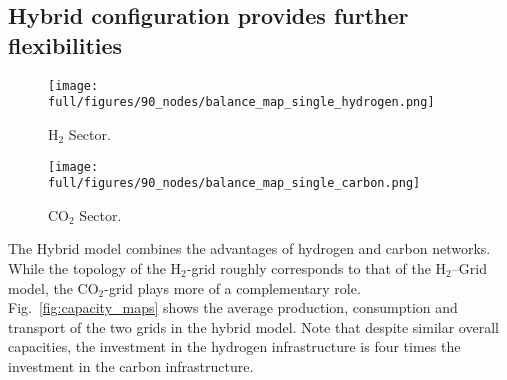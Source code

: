 \documentclass[twocolumn]{article}
\newcommand{\carbon}{CO$_2$}
\newcommand{\hydrogen}{H$_2$}
\newcommand{\hydrogengrid}{\hydrogen{}--Grid}
\begin{document}
\subsection*{Hybrid configuration provides further flexibilities}

\begin{figure*}[ht!]
    \centering
    \begin{subfigure}{.49\textwidth}
        \centering
        \texttt{[image: full/figures/90\_nodes/balance\_map\_single\_hydrogen.png]}
        \caption{\hydrogen{} Sector.}
        \label{fig:capacity_map_hydrogen_co2}
    \end{subfigure}
    \hfill
    \begin{subfigure}{.49\textwidth}
        \centering
        \texttt{[image: full/figures/90\_nodes/balance\_map\_single\_carbon.png]}
        \caption{\carbon{} Sector.}
        \label{fig:capacity_map_carbon_co2}
    \end{subfigure}%
    \caption{Optimal production and transport capacities of the carbon and hydrogen sector in a net-zero energy system in Europe with both \carbon{} and \hydrogen{} network expansion (Hybrid).
    }
    \label{fig:capacity_maps}
\end{figure*}

The Hybrid model combines the advantages of hydrogen and carbon networks. While the topology of the \hydrogen{}-grid roughly corresponds to that of the \hydrogengrid{} model, the \carbon{}-grid plays more of a complementary role. Fig.~\ref{fig:capacity_maps} shows the average production, consumption and transport of the two grids in the hybrid model. Note that despite similar overall capacities, the investment in the hydrogen infrastructure is four times the investment in the carbon infrastructure.
\end{document}
